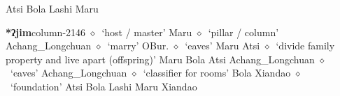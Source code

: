          Atsi 
\hspace{1ex}
         Bola 
\hspace{1ex}
         Lashi 
\hspace{1ex}
         Maru 
  \item {\footnotesize \textbf{*ʔjim}}{\tiny column-2146}
         $\diamond$~`host / master'
         Maru 
\hspace{1ex}
         $\diamond$~`pillar / column'
         Achang\_Longchuan 
\hspace{1ex}
         $\diamond$~`marry'
         OBur. 
\hspace{1ex}
         $\diamond$~`eaves'
         Maru 
\hspace{1ex}
         Atsi 
\hspace{1ex}
         $\diamond$~`divide family property and live apart (offspring)'
         Maru 
\hspace{1ex}
         Bola 
\hspace{1ex}
         Atsi 
\hspace{1ex}
         Achang\_Longchuan 
\hspace{1ex}
         $\diamond$~`eaves'
         Achang\_Longchuan 
\hspace{1ex}
         $\diamond$~`classifier for rooms'
         Bola 
\hspace{1ex}
         Xiandao 
\hspace{1ex}
         $\diamond$~`foundation'
         Atsi 
\hspace{1ex}
         Bola 
\hspace{1ex}
         Lashi 
\hspace{1ex}
         Maru 
\hspace{1ex}
         Xiandao 
